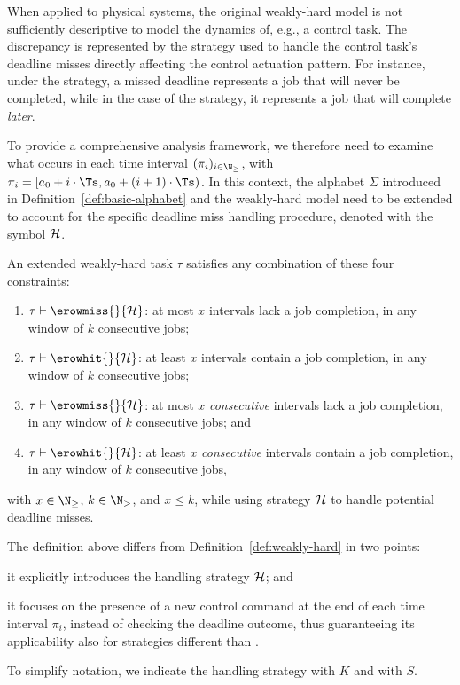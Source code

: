 When applied to physical systems, the original weakly-hard model is not sufficiently descriptive to model the dynamics of, e.g., a control task.
The discrepancy is represented by the strategy used to handle the control task's deadline misses directly affecting the control actuation pattern.
For instance, under the \tK{} strategy, a missed deadline represents a job that will never be completed, while in the case of the \tS{} strategy, it represents a job that will complete \emph{later}.

To provide a comprehensive analysis framework, we therefore need to examine what occurs in each time interval $(\pi_i)_{i \in \N_{\geq}}$, with $\pi_i = [a_0 + i\cdot \Ts, a_0 + (i+1)\cdot \Ts)$. 
In this context, the alphabet $\Sigma$ introduced in Definition~\ref{def:basic-alphabet} and the weakly-hard model need to be extended to account for the specific deadline miss handling procedure, denoted with the symbol $\mathcal{H}$.

\begin{definition}%
    \label{def:new-mk}%
    An extended weakly-hard task $\tau$ satisfies any combination of these four constraints:
    \begin{enumerate}[label=(\roman*)]
        \item $\tau \vdash \erowmiss{}{\strat}$: at most $x$ intervals lack a job completion, in any window of $k$ consecutive jobs;
        \item $\tau \vdash \erowhit{}{\strat}$: at least $x$ intervals contain a job completion, in any window of $k$ consecutive jobs;
        \item $\tau \vdash \erowmiss{}{\strat}$: at most $x$ \emph{consecutive} intervals lack a job completion, in any window of $k$ consecutive jobs; and
        \item $\tau \vdash \erowhit{}{\strat}$: at least $x$ \emph{consecutive} intervals contain a job completion, in any window of $k$ consecutive jobs,
    \end{enumerate}
    with $x\in \N_{\geq}$, $k \in \N_{>}$, and $x\leq k$, while using strategy $\mathcal{H}$ to handle potential deadline misses.
\end{definition}

The definition above differs from Definition~\ref{def:weakly-hard} in two points:
\begin{enumerate*}[label=(\roman*)]
    \item it explicitly introduces the handling strategy $\mathcal{H}$; and
    \item it focuses on the presence of a new control command at the end of each time interval $\pi_i$, instead of checking the deadline outcome, thus guaranteeing its applicability also for strategies different than \tK{}.
\end{enumerate*}
To simplify notation, we indicate the \tK{} handling strategy with $K$ and \tS{} with $S$.

